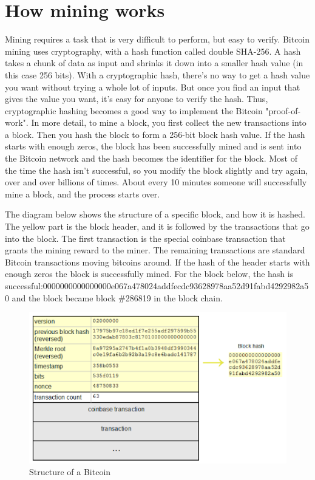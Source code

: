 \section{How mining works}
Mining requires a task that is very difficult to perform, but easy to verify. Bitcoin mining uses cryptography, with a hash function called double SHA-256. A hash takes a chunk of data as input and shrinks it down into a smaller hash value (in this case 256 bits). With a cryptographic hash, there's no way to get a hash value you want without trying a whole lot of inputs. But once you find an input that gives the value you want, it's easy for anyone to verify the hash. Thus, cryptographic hashing becomes a good way to implement the Bitcoin "proof-of-work"\cite{nakamoto2012bitcoin}.
In more detail, to mine a block, you first collect the new transactions into a block. Then you hash the block to form a 256-bit block hash value. If the hash starts with enough zeros, the block has been successfully mined and is sent into the Bitcoin network and the hash becomes the identifier for the block. Most of the time the hash isn't successful, so you modify the block slightly and try again, over and over billions of times. About every 10 minutes someone will successfully mine a block, and the process starts over.

The diagram below shows the structure of a specific block, and how it is hashed. The yellow part is the block header, and it is followed by the transactions that go into the block. The first transaction is the special coinbase transaction that grants the mining reward to the miner. The remaining transactions are standard Bitcoin transactions moving bitcoins around. If the hash of the header starts with enough zeros the block 
is successfully mined. For the block below, the hash is successful:0000000000000000e067a478024addfecdc93628978aa52d91fabd4292982a50 and the block became block \#286819 in the block chain\cite{nakamoto2012bitcoin}.

\begin{figure}[ht!]
\centering
\includegraphics[trim = 0mm 0mm 0mm 0mm, width=120mm]{images/structure_of_bitcoin_block}
\caption{Structure of a Bitcoin}
\end{figure}

